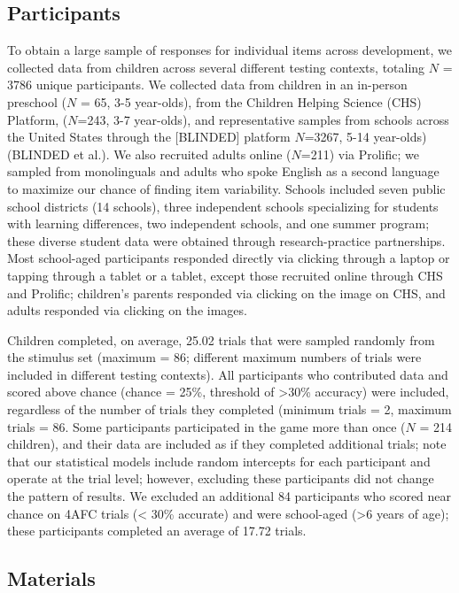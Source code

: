 \documentclass[
  man,mask]{apa6}
\begin{document}
\subsection{Participants}\label{participants}

To obtain a large sample of responses for individual items across development, we collected data from children across several different testing contexts, totaling \(N\) = 3786 unique participants. We collected data from children in an in-person preschool (\(N\) = 65, 3-5 year-olds), from the Children Helping Science (CHS) Platform, (\(N\)=243, 3-7 year-olds), and representative samples from schools across the United States through the {[}BLINDED{]} platform \(N\)=3267, 5-14 year-olds) (BLINDED et al.). We also recruited adults online (\(N\)=211) via Prolific; we sampled from monolinguals and adults who spoke English as a second language to maximize our chance of finding item variability. Schools included seven public school districts (14 schools), three independent schools specializing for students with learning differences, two independent schools, and one summer program; these diverse student data were obtained through research-practice partnerships. Most school-aged participants responded directly via clicking through a laptop or tapping through a tablet or a tablet, except those recruited online through CHS and Prolific; children's parents responded via clicking on the image on CHS, and adults responded via clicking on the images.

Children completed, on average, 25.02 trials that were sampled randomly from the stimulus set (maximum = 86; different maximum numbers of trials were included in different testing contexts).
All participants who contributed data and scored above chance (chance = 25\%, threshold of \textgreater30\% accuracy) were included, regardless of the number of trials they completed (minimum trials = 2, maximum trials = 86. Some participants participated in the game more than once (\(N\) = 214 children), and their data are included as if they completed additional trials; note that our statistical models include random intercepts for each participant and operate at the trial level; however, excluding these participants did not change the pattern of results.
We excluded an additional 84 participants who scored near chance on 4AFC trials (\textless{} 30\% accurate) and were school-aged (\textgreater6 years of age); these participants completed an average of 17.72 trials.

\subsection{Materials}\label{materials}
\end{document}
